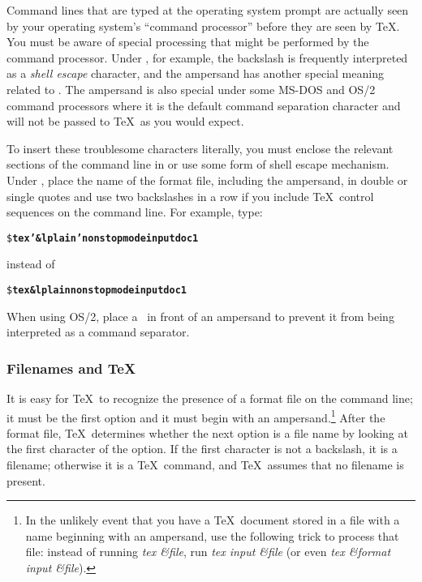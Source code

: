 Command lines that are typed at the operating system prompt are
actually seen by your operating system's ``command processor'' before
they are seen by \TeX.  You must be aware of special processing that
might be performed by the command processor.  Under \Unix, for example,
the backslash is frequently interpreted 
as a \textit{shell escape}
character, and 
the ampersand has another special 
meaning related to
.  The ampersand is also special under some MS-DOS and OS/2
command processors where it is the default command separation
character and will not be passed to \TeX\ as you would expect.

To insert these troublesome characters literally, you must enclose the
relevant sections of the command line 
in  or 
use some
form of shell escape mechanism.  Under \Unix, place the name of the
format file, including the ampersand, in double or
\linebreak
\newpage
single quotes and
use two backslashes in a row if you include \TeX\ control sequences on
the command line.  For example, type:

\begin{exindent}
\begin{alltt}
\$ \textbf{tex '&lplain' \bs{\bs}nonstopmode \bs{\bs}input doc1}
\end{alltt}
\end{exindent}

instead of

\begin{exindent}
\begin{alltt}
\$ \textbf{tex &lplain {\bs}nonstopmode {\bs}input doc1}
\end{alltt}
\end{exindent}

When using OS/2, place a \caret\ in front of an ampersand
to prevent it from being interpreted as a command separator.

\subsubsection{Filenames and \protect\TeX}

%
%
It 
is easy for \TeX\ to recognize the presence of a format file on the
command line; it must be the first option and it must begin with an
ampersand.\footnote{In the unlikely event that you have a \TeX\ document
stored in a file with a name beginning with an ampersand, use the following
trick to process that file: instead of running \textit{tex \textnormal{\&}file}, run
\textit{tex {\bs}input \textnormal{\&}file} (or even 
\textit{tex \textnormal{\&}format {\bs}input \textnormal{\&}file}).}
After the format file,
\TeX\ determines whether the next option is a file name by looking at
the first character of the option.  If the first character is not a
backslash, it is a filename; otherwise it is a \TeX\ command, and \TeX\
assumes that no filename is present.

